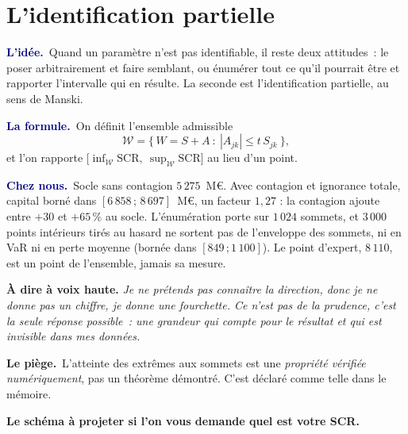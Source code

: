 \documentclass[11pt,a4paper]{article}
\newcommand{\lidee}[1]{\smallskip\noindent\textcolor{navy}{\textbf{L'idée.}}\ #1\par}
\newcommand{\laformule}[1]{\smallskip\noindent\textcolor{navy}{\textbf{La formule.}}\ #1\par}
\newcommand{\cheznous}[1]{\smallskip\noindent\textcolor{navy}{\textbf{Chez nous.}}\ #1\par}
\newcommand{\lepiege}[1]{\smallskip\noindent\textcolor{accent}{\textbf{Le piège.}}\ #1\par}
\newcommand{\laphrase}[1]{\begin{phrasebox}\textbf{À dire à voix haute.} \emph{#1}\end{phrasebox}}
\begin{document}
\section{L'identification partielle}

\lidee{Quand un paramètre n'est pas identifiable, il reste deux attitudes~: le poser
arbitrairement et faire semblant, ou énumérer tout ce qu'il pourrait être et rapporter
l'intervalle qui en résulte. La seconde est l'identification partielle, au sens de Manski.}

\laformule{On définit l'ensemble admissible
\[
  \mathcal{W}=\bigl\{\,W=S+A \ :\ |A_{jk}|\le t\,S_{jk}\ \bigr\},
\]
et l'on rapporte $\bigl[\inf_{\mathcal{W}}\mathrm{SCR},\ \sup_{\mathcal{W}}\mathrm{SCR}\bigr]$
au lieu d'un point.}

\cheznous{Socle sans contagion $5\,275$~M\euro. Avec contagion et ignorance totale, capital
borné dans $[6\,858\,;\,8\,697]$~M\euro, un facteur $1{,}27$ : la contagion ajoute entre $+30$ et
$+65\,\%$ au socle. L'énumération porte sur $1\,024$ sommets, et $3\,000$ points intérieurs
tirés au hasard ne sortent pas de l'enveloppe des sommets, ni en VaR ni en perte moyenne (bornée
dans $[849\,;1\,100]$). Le point d'expert, $8\,110$, est un point de l'ensemble, jamais sa
mesure.}

\laphrase{Je ne prétends pas connaître la direction, donc je ne donne pas un chiffre, je
donne une fourchette. Ce n'est pas de la prudence, c'est la seule réponse possible~: une
grandeur qui compte pour le résultat et qui est invisible dans mes données.}

\lepiege{L'atteinte des extrêmes aux sommets est une \emph{propriété vérifiée
numériquement}, pas un théorème démontré. C'est déclaré comme telle dans le mémoire.}

\medskip
\noindent\textbf{Le schéma à projeter si l'on vous demande \og quel est votre SCR\fg{}.}
\end{document}
